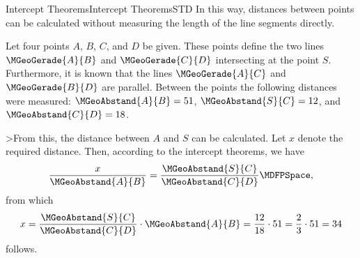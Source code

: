 \begin{MXContent}{Intercept Theorems}{Intercept Theorems}{STD}
In this way, distances between points can be calculated without 
measuring the length of the line segments directly.

\begin{MExample}
Let four points $A$, $B$, $C$, and $D$ be given. These points define the
two lines $\MGeoGerade{A}{B}$ and $\MGeoGerade{C}{D}$ intersecting at the point $S$. 
Furthermore, it is known that the lines $\MGeoGerade{A}{C}$ and $\MGeoGerade{B}{D}$ 
are parallel. Between the points the following distances were measured: 
$\MGeoAbstand{A}{B} = 51$, $\MGeoAbstand{S}{C} = 12 $, and 
$\MGeoAbstand{C}{D} = 18$.

\begin{center}
\end{center}

>From this, the distance between $A$ and $S$ can be calculated. Let $x$ denote the 
required distance. Then, according to the intercept theorems, we have
\[
   \frac{x}{\MGeoAbstand{A}{B}}
 = \frac{\MGeoAbstand{S}{C}}{\MGeoAbstand{C}{D}} \MDFPSpace,
\]
from which
\[
x = \frac{\MGeoAbstand{S}{C}}{\MGeoAbstand{C}{D}} \cdot \MGeoAbstand{A}{B} %
 = \frac{12}{18} \cdot 51 = \frac{2}{3} \cdot 51 = 34 %
\]
follows.
\end{MExample}
\end{MXContent}


